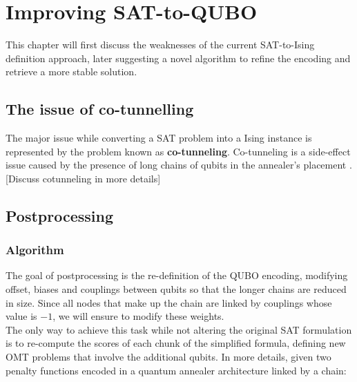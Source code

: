 \chapter{Improving SAT-to-QUBO}
\label{cha:QAcore}

This chapter will first discuss the weaknesses of the current SAT-to-Ising definition approach, later suggesting a novel algorithm to refine the encoding and retrieve a more stable solution. 

\section{The issue of co-tunnelling}

The major issue while converting a SAT problem into a Ising instance is represented by the problem known as \textbf{co-tunneling}. Co-tunneling is a side-effect issue caused by the presence of long chains of qubits in the annealer's placement \cite{cotunneling}. [Discuss cotunneling in more details]

\section{Postprocessing}

\subsection{Algorithm}

The goal of postprocessing is the re-definition of the QUBO encoding, modifying offset, biases and couplings between qubits so that the longer chains are reduced in size. Since all nodes that make up the chain are linked by couplings whose value is $-1$, we will ensure to modify these weights. \\
The only way to achieve this task while not altering the original SAT formulation is to re-compute the scores of each chunk of the simplified formula, defining new OMT problems that involve the additional qubits. In more details, given two penalty functions encoded in a quantum annealer architecture linked by a chain:

